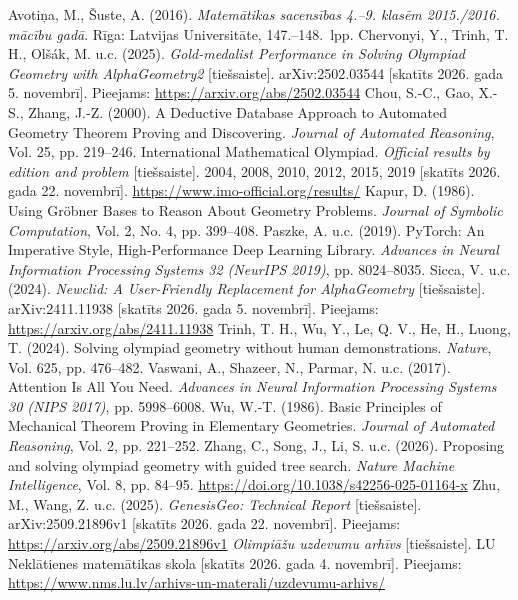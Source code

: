 \documentclass[nolabels]{../template/zpd}
\begin{document}
\begin{avoti}
  \avots Avotiņa, M., Šuste, A. (2016). \textit{Matemātikas sacensības 4.--9. klasēm 2015./2016. mācību gadā}. Rīga: Latvijas Universitāte, 147.--148.~lpp.
  \avots Chervonyi, Y., Trinh, T. H., Olšák, M. u.c. (2025). \textit{Gold-medalist Performance in Solving Olympiad Geometry with AlphaGeometry2} [tiešsaiste]. arXiv:2502.03544 [skatīts 2026. gada 5. novembrī]. Pieejams: \url{https://arxiv.org/abs/2502.03544}
  \avots Chou, S.-C., Gao, X.-S., Zhang, J.-Z. (2000). A Deductive Database Approach to Automated Geometry Theorem Proving and Discovering. \textit{Journal of Automated Reasoning}, Vol. 25, pp. 219--246.
  \avots International Mathematical Olympiad. \textit{Official results by edition and problem} [tiešsaiste]. 2004, 2008, 2010, 2012, 2015, 2019 [skatīts 2026. gada 22. novembrī]. \url{https://www.imo-official.org/results/}
  \avots Kapur, D. (1986). Using Gröbner Bases to Reason About Geometry Problems. \textit{Journal of Symbolic Computation}, Vol. 2, No. 4, pp. 399--408.
  \avots Paszke, A. u.c. (2019). PyTorch: An Imperative Style, High-Performance Deep Learning Library. \textit{Advances in Neural Information Processing Systems 32 (NeurIPS 2019)}, pp. 8024--8035.
  \avots Sicca, V. u.c. (2024). \textit{Newclid: A User-Friendly Replacement for AlphaGeometry} [tiešsaiste]. arXiv:2411.11938 [skatīts 2026. gada 5. novembrī]. Pieejams: \url{https://arxiv.org/abs/2411.11938}
  \avots Trinh, T. H., Wu, Y., Le, Q. V., He, H., Luong, T. (2024). Solving olympiad geometry without human demonstrations. \textit{Nature}, Vol. 625, pp. 476--482.
  \avots Vaswani, A., Shazeer, N., Parmar, N. u.c. (2017). Attention Is All You Need. \textit{Advances in Neural Information Processing Systems 30 (NIPS 2017)}, pp. 5998--6008.
  \avots Wu, W.-T. (1986). Basic Principles of Mechanical Theorem Proving in Elementary Geometries. \textit{Journal of Automated Reasoning}, Vol. 2, pp. 221--252.
  \avots Zhang, C., Song, J., Li, S. u.c. (2026). Proposing and solving olympiad geometry with guided tree search. \textit{Nature Machine Intelligence}, Vol. 8, pp. 84--95. \url{https://doi.org/10.1038/s42256-025-01164-x}
  \avots Zhu, M., Wang, Z. u.c. (2025). \textit{GenesisGeo: Technical Report} [tiešsaiste]. arXiv:2509.21896v1 [skatīts 2026. gada 22. novembrī]. Pieejams: \url{https://arxiv.org/abs/2509.21896v1}
  \avots \textit{Olimpiāžu uzdevumu arhīvs} [tiešsaiste]. LU Neklātienes matemātikas skola [skatīts 2026. gada 4. novembrī]. Pieejams: \url{https://www.nms.lu.lv/arhivs-un-materali/uzdevumu-arhivs/}
\end{avoti}
\end{document}
